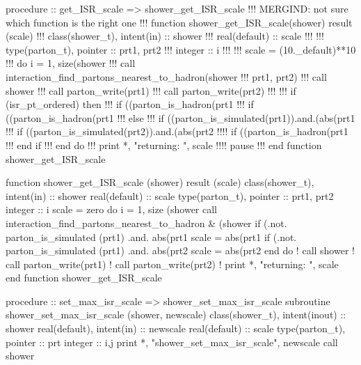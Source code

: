 \eatline
\nwendcode{}\nwdocspar
\nwenddocs{}\plusendmoddef
  procedure :: get_ISR_scale => shower_get_ISR_scale
\nwendcode{}\plusendmoddef
!!! MERGIND: not sure which function is the right one
!!!    function shower_get_ISR_scale(shower) result (scale)
!!!      class(shower_t), intent(in) :: shower
!!!      real(default) :: scale
!!!
!!!      type(parton_t), pointer :: prt1, prt2
!!!      integer :: i
!!!
!!!      scale = (10._default)**10
!!!      do i = 1, size(shower%
!!!         call interaction_find_partons_nearest_to_hadron(shower%
!!!              prt1, prt2)
!!!         call shower%
!!!         call parton_write(prt1)
!!!         call parton_write(prt2)
!!!
!!!         if (isr_pt_ordered) then
!!!            if ((parton_is_hadron(prt1%
!!!            if ((parton_is_hadron(prt1%
!!!         else
!!!            if ((parton_is_simulated(prt1)).and.(abs(prt1%
!!!            if ((parton_is_simulated(prt2)).and.(abs(prt2%
!!!!            if ((parton_is_hadron(prt1%
!!!         end if
!!!      end do
!!!      print *, "returning: ", scale
!!!!      pause
!!!    end function shower_get_ISR_scale

  function shower_get_ISR_scale (shower) result (scale)
    class(shower_t), intent(in) :: shower
    real(default) :: scale
    type(parton_t), pointer :: prt1, prt2
    integer :: i
    scale = zero
    do i = 1, size (shower%
       call interaction_find_partons_nearest_to_hadron &
            (shower%
       if (.not. parton_is_simulated (prt1) .and. abs(prt1%
            scale = abs(prt1%
       if (.not. parton_is_simulated (prt1) .and. abs(prt2%
            scale = abs(prt2%
    end do
    ! call shower%
    ! call parton_write(prt1)
    ! call parton_write(prt2)
    ! print *, "returning: ", scale
  end function shower_get_ISR_scale

\eatline
\nwendcode{}\nwdocspar
\nwenddocs{}\plusendmoddef
  procedure :: set_max_isr_scale => shower_set_max_isr_scale
\nwendcode{}\plusendmoddef
  subroutine shower_set_max_isr_scale (shower, newscale)
    class(shower_t), intent(inout) :: shower
    real(default), intent(in) :: newscale
    real(default) :: scale
    type(parton_t), pointer :: prt
    integer :: i,j
    print *, "shower_set_max_isr_scale", newscale
    call shower%

